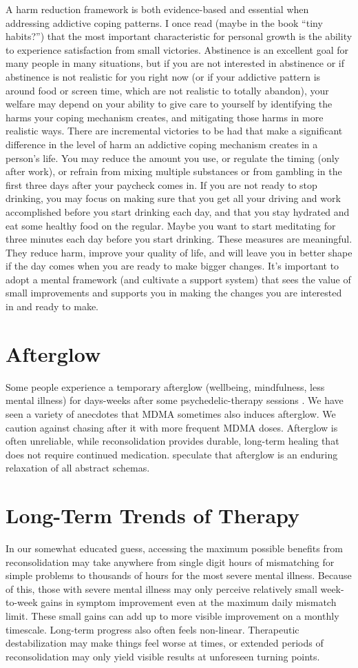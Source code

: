 \documentclass[12pt,letterpaper]{book}
\begin{document}
A harm reduction framework is both evidence-based and essential when addressing addictive coping patterns. I once read (maybe in the book “tiny habits?”) that the most important characteristic for personal growth is the ability to experience satisfaction from small victories. Abstinence is an excellent goal for many people in many situations, but if you are not interested in abstinence or if abstinence is not realistic for you right now (or if your addictive pattern is around food or screen time, which are not realistic to totally abandon), your welfare may depend on your ability to give care to yourself by identifying the harms your coping mechanism creates, and mitigating those harms in more realistic ways. There are incremental victories to be had that make a significant difference in the level of harm an addictive coping mechanism creates in a person's life. You may reduce the amount you use, or regulate the timing (only after work), or refrain from mixing multiple substances or from gambling in the first three days after your paycheck comes in. If you are not ready to stop drinking, you may focus on making sure that you get all your driving and work accomplished before you start drinking each day, and that you stay hydrated and eat some healthy food on the regular. Maybe you want to start meditating for three minutes each day before you start drinking. These measures are meaningful. They reduce harm, improve your quality of life, and will leave you in better shape if the day comes when you are ready to make bigger changes. It's important to adopt a mental framework (and cultivate a support system) that sees the value of small improvements and supports you in making the changes you are interested in and ready to make.
\section{Afterglow}
Some people experience a temporary afterglow (wellbeing, mindfulness, less mental illness) for days-weeks after some psychedelic-therapy sessions \cite{evansAfterglow}. We have seen a variety of anecdotes that MDMA sometimes also induces afterglow. We caution against chasing after it with more frequent MDMA doses. Afterglow is often unreliable, while reconsolidation provides durable, long-term healing that does not require continued medication. \textcite{carhart2019rebus} speculate that afterglow is an enduring relaxation of all abstract schemas.
\section{Long-Term Trends of Therapy}
In our somewhat educated guess, accessing the maximum possible benefits from reconsolidation may take anywhere from single digit hours of mismatching for simple problems to thousands of hours for the most severe mental illness. Because of this, those with severe mental illness may only perceive relatively small week-to-week gains in symptom improvement even at the maximum daily mismatch limit. These small gains can add up to more visible improvement on a monthly timescale. Long-term progress also often feels non-linear. Therapeutic destabilization may make things feel worse at times, or extended periods of reconsolidation may only yield visible results at unforeseen turning points.
\end{document}
